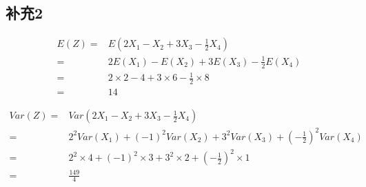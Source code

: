 \documentclass[a4paper,12pt]{ctexart}
\begin{document}
\subsection*{补充2}

\begin{align*}
	E(Z) =& E(2X_1 - X_2 + 3X_3 - \frac{1}{2}X_4) \\
	     =& 2 E(X_1) - E(X_2) + 3 E(X_3) - \frac{1}{2} E(X_4) \\
		 =& 2 \times 2 - 4 + 3 \times 6 - \frac{1}{2} \times 8 \\
		 =& 14
\end{align*}

\begin{align*}
	Var(Z) =& Var(2X_1 - X_2 + 3X_3 - \frac{1}{2}X_4) \\
	       =& 2^2 Var(X_1) + (-1)^2 Var(X_2) + 3^2 Var(X_3) + (-\frac{1}{2})^2 Var(X_4) \\
		   =& 2^2 \times 4 + (-1)^2 \times 3 + 3^2 \times 2 + (-\frac{1}{2})^2 \times 1 \\
		   =& \frac{149}{4}
\end{align*}
\end{document}
